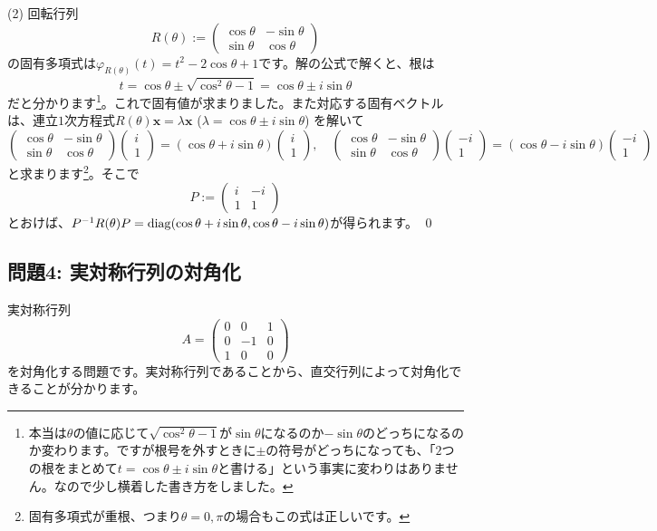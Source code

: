 \noindent (2) 回転行列
\[
R(\theta) :=
\begin{pmatrix}
\cos \theta & -\sin \theta \\
\sin \theta & \cos \theta
\end{pmatrix}
\]
の固有多項式は$\varphi_{R(\theta)}(t) = t^2 - 2\cos \theta + 1$です。解の公式で解くと、根は
\[
t = \cos \theta \pm \sqrt{\cos^2\theta - 1} = \cos \theta \pm i \sin \theta
\]
だと分かります\footnote{本当は$\theta$の値に応じて$\sqrt{\cos^2\theta - 1}$が$\sin \theta$になるのか$-\sin\theta$のどっちになるのか変わります。ですが根号を外すときに$\pm$の符号がどっちになっても、「$2$つの根をまとめて$t = \cos \theta \pm i \sin \theta$と書ける」という事実に変わりはありません。なので少し横着した書き方をしました。}。これで固有値が求まりました。また対応する固有ベクトルは、連立$1$次方程式$R(\theta)\bm{x} = \lambda \bm{x}$ ($\lambda = \cos \theta \pm i \sin \theta$) を解いて
\[
\begin{pmatrix}
\cos \theta & -\sin \theta \\
\sin \theta & \cos \theta
\end{pmatrix}
\begin{pmatrix}
i \\
1
\end{pmatrix}
=
(\cos\theta + i \sin \theta)
\begin{pmatrix}
i \\
1
\end{pmatrix}, \quad
\begin{pmatrix}
\cos \theta & -\sin \theta \\
\sin \theta & \cos \theta
\end{pmatrix}
\begin{pmatrix}
-i \\
1
\end{pmatrix}
=
(\cos\theta - i \sin \theta)
\begin{pmatrix}
-i \\
1
\end{pmatrix}
\]
と求まります\footnote{固有多項式が重根、つまり$\theta = 0, \pi$の場合もこの式は正しいです。}。そこで
\[
P :=
\begin{pmatrix}
i & -i \\
1 & 1
\end{pmatrix}
\]
とおけば、$P^{-1} R(\theta) P = \operatorname{diag}(\cos\theta + i\sin \theta, \cos\theta - i \sin\theta)$が得られます。 \qed

\subsection{問題4: 実対称行列の対角化}
実対称行列
\[
A =
\begin{pmatrix}
0 & 0 & 1 \\
0 & -1 & 0 \\
1 & 0 & 0 
\end{pmatrix}
\]
を対角化する問題です。実対称行列であることから、直交行列によって対角化できることが分かります。

